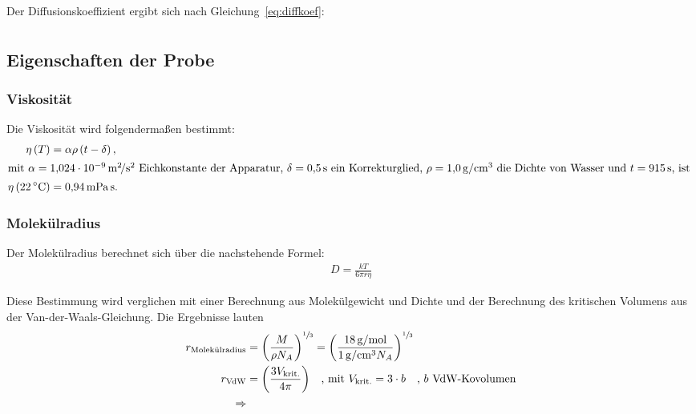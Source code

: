 Der Diffusionskoeffizient ergibt sich nach Gleichung~\eqref{eq:diffkoef}:
\begin{align}%
  \label{eq:d}
  
\end{align}


\subsection{Eigenschaften der Probe}%
\label{sec:eigenschaften_der_probe}

\subsubsection{Viskosität}%
\label{sub:viskositaet}

Die Viskosität wird folgendermaßen bestimmt:
\begin{align}
  \nonumber
  \eta \left(T\right) &= \alpha \rho \left(t - \delta\right), \\
  \intertext{%
    mit $\alpha = \SI[]{1.024e-09}{\meter\squared\per\second\squared}$ Eichkonstante der Apparatur,
    $\delta = \SI[]{0.5}{\second}$ ein Korrekturglied,
    $\rho = \SI[]{1.0}{\gram\per\centi\meter\cubed}$ die Dichte von Wasser
    und $t = \SI{915}{\second}$, ist
  }
  \label{eq:viskositaet}
  \eta \left(\SI{22}{\celsius}\right)&= \SI[]{0.94}{\milli\pascal\second}.
\end{align}

\subsubsection{Molekülradius}%
\label{sub:molekuelradius}
Der Molekülradius berechnet sich über die nachstehende Formel:
\begin{align}
  \label{eq:molekuelradius}
  D = \frac{k T}{6 \pi r \eta}
\end{align}

Diese Bestimmung wird verglichen mit einer Berechnung aus Molekülgewicht und Dichte
und der Berechnung des kritischen Volumens aus der Van-der-Waals-Gleichung.
Die Ergebnisse lauten
\begin{align*}
  r_\text{Molekülradius} &= {\left(\frac{M}{\rho N_A}\right)}^{\sfrac{1}{3}} =
    {\left(\frac{\SI{18}{\gram\per\mole}}{\SI{1}{\gram\per\centi\meter\tothe3} N_A}\right)}^{\sfrac{1}{3}} \\
    r_\text{VdW} &= {\left(\frac{3 V_\text{krit.}}{4 \pi}\right)}
    \hspace{1em}\text{, mit } V_\text{krit.} = 3 \cdot b \hspace{1em}\text{, $b$ VdW-Kovolumen}\\
  \Rightarrow 
\end{align*}

